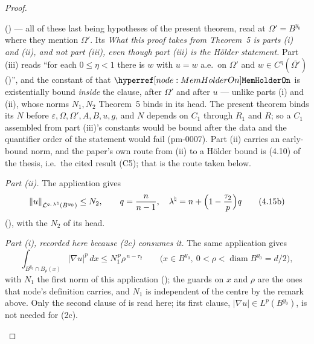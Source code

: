\begin{proof}
\begin{enumerate}
  () --- all of these last being hypotheses of the
  present theorem, read at $\Omega'=B^{y_0}$ where they mention $\Omega'$.  Its
  \emph{What this proof takes from Theorem~5 is parts \textup{(i)} and
  \textup{(ii)}, and \emph{not} part \textup{(iii)}, even though part
  \textup{(iii)} is the H\"older statement.}  Part (iii) reads ``for each
  $0\le\eta<1$ there is $w$ with $u=w$ a.e.\ on $\Omega'$ and
  $w\in C^{\eta}(\overline{\Omega'})$ ()'', and the
  constant of that $\noderef{MemHolderOn}$ is existentially bound \emph{inside}
  the clause, after $\Omega'$ and after $u$ --- unlike parts (i) and (ii), whose
  norms $N_1,N_2$ Theorem~5 binds in its head.  The present theorem binds its
  $N$ before $\varepsilon,\Omega,\Omega',A,B,u,g$, and $N$ depends on $C_1$
  through $R_1$ and $R$; so a $C_1$ assembled from part (iii)'s constants would
  be bound after the data and the quantifier order of the statement would fail
  (pm-0007).  Part (ii) carries an early-bound norm, and the paper's own route
  from (ii) to a H\"older bound is (4.10) of the thesis, i.e.\ the cited result (C5);
  that is the route taken below.

  \emph{Part \textup{(ii)}.}  The application gives
  \[
  \|u\|_{\mathcal L^{q,\,\lambda^\natural}(B^{y_0})}\le N_2 ,
  \qquad
  q=\frac n{n-1},\quad \lambda^\natural=n+\Bigl(1-\frac{\tau_2}p\Bigr)q
  \tag{4.15b}
  \]
  (), with the $N_2$ of its head.

  \emph{Part \textup{(i)}, recorded here because \textup{(2c)} consumes it.}
  The same application gives
  \[
  \int_{B^{y_0}\cap B_\rho(x)}|\nabla u|^p\,dx\le N_1^{\,p}\rho^{\,n-\tau_2}
  \qquad\bigl(x\in B^{y_0},\ 0<\rho<\operatorname{diam}B^{y_0}=d/2\bigr),
  \tag{4.15a}
  \]
  with $N_1$ the first norm of this application (); the
  guards on $x$ and $\rho$ are the ones that node's definition carries, and
  $N_1$ is independent of the centre by the remark above.  Only the second
  clause of  is read here; its first clause,
  $|\nabla u|\in L^p(B^{y_0})$, is not needed for (2c).


\end{enumerate}
\end{proof}
